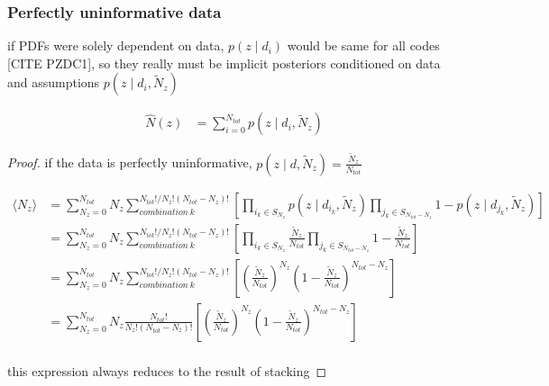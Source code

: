 
\subsubsection{Perfectly uninformative data}
\label{sec:prior}

\begin{theorem}
if PDFs were solely dependent on data, $p(z \mid d_{i})$ would be same for all codes [CITE PZDC1], so they really must be implicit posteriors conditioned on data and assumptions $p(z \mid d_{i}, \tilde{N}_{z})$

\begin{align}
\label{eq:stackwithprior}
\hat{N}(z) &= \sum_{i = 0}^{N_{tot}} p(z \mid d_{i}, \tilde{N}_{z})
\end{align}
\end{theorem}
\begin{proof}
if the data is perfectly uninformative, $p(z \mid d, \tilde{N}_{z}) = \frac{\tilde{N}_{z}}{N_{tot}}$

\begin{align}
\label{eq:prior}
\langle N_{z} \rangle &= \sum_{N_{z} = 0}^{N_{tot}} N_{z} \sum_{combination\ k}^{N_{tot}! / N_{z}! (N_{tot} - N_{z})!} \left[ \prod_{i_{k} \in S_{N_{z}}} p(z \mid d_{i_{k}}, \tilde{N}_{z}) \prod_{j_{k} \in S_{N_{tot} - N_{z}}} 1 - p(z \mid d_{j_{k}}, \tilde{N}_{z}) \right]\\
&= \sum_{N_{z} = 0}^{N_{tot}} N_{z} \sum_{combination\ k}^{N_{tot}! / N_{z}! (N_{tot} - N_{z})!} \left[ \prod_{i_{k} \in S_{N_{z}}} \frac{\tilde{N}_{z}}{N_{tot}} \prod_{j_{k} \in S_{N_{tot} - N_{z}}} 1 - \frac{\tilde{N}_{z}}{N_{tot}} \right]\\
&= \sum_{N_{z} = 0}^{N_{tot}} N_{z} \sum_{combination\ k}^{N_{tot}! / N_{z}! (N_{tot} - N_{z})!} \left[ \left(\frac{\tilde{N}_{z}}{N_{tot}}\right)^{N_{z}} \left(1 - \frac{\tilde{N}_{z}}{N_{tot}}\right)^{N_{tot}-N_{z}} \right]\\
&= \sum_{N_{z} = 0}^{N_{tot}} N_{z} \frac{N_{tot}!}{N_{z}! (N_{tot} - N_{z})!} \left[ \left(\frac{\tilde{N}_{z}}{N_{tot}}\right)^{N_{z}} \left(1 - \frac{\tilde{N}_{z}}{N_{tot}}\right)^{N_{tot}-N_{z}} \right]\\
\end{align}

this expression always reduces to the result of stacking
\end{proof}

